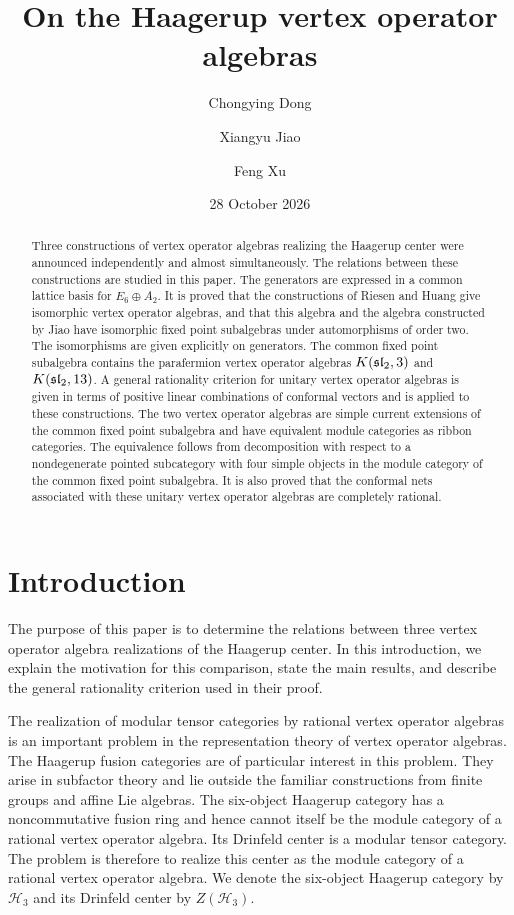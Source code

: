 \documentclass[11pt,reqno]{amsart}
\title[On the Haagerup vertex operator algebras]{On the Haagerup vertex operator algebras}
\author{Chongying Dong}
\author{Xiangyu Jiao}
\author{Feng Xu}
\date{28 October 2026}
\theoremstyle{definition}\newtheorem{definition}[theorem]{Definition}
\theoremstyle{remark}\newtheorem{remark}[theorem]{Remark}
\numberwithin{equation}{section}
\begin{document}
\begin{abstract}
Three constructions of vertex operator algebras realizing the Haagerup center were announced independently and almost simultaneously. The relations between these constructions are studied in this paper. The generators are expressed in a common lattice basis for $E_6\oplus A_2$. It is proved that the constructions of Riesen and Huang give isomorphic vertex operator algebras, and that this algebra and the algebra constructed by Jiao have isomorphic fixed point subalgebras under automorphisms of order two. The isomorphisms are given explicitly on generators. The common fixed point subalgebra contains the parafermion vertex operator algebras $K(\mathfrak{sl}_2,3)$ and $K(\mathfrak{sl}_2,13)$. A general rationality criterion for unitary vertex operator algebras is given in terms of positive linear combinations of conformal vectors and is applied to these constructions. The two vertex operator algebras are simple current extensions of the common fixed point subalgebra and have equivalent module categories as ribbon categories. {The equivalence follows from decomposition with respect to a nondegenerate pointed subcategory with four simple objects in the module category of the common fixed point subalgebra.} It is also proved that the conformal nets associated with these unitary vertex operator algebras are completely rational.
\end{abstract}
\maketitle

\section{Introduction}
The purpose of this paper is to determine the relations between three vertex operator algebra realizations of the Haagerup center. In this introduction, we explain the motivation for this comparison, state the main results, and describe the general rationality criterion used in their proof.

The realization of modular tensor categories by rational vertex operator algebras is an important problem in the representation theory of vertex operator algebras. The Haagerup fusion categories are of particular interest in this problem. They arise in subfactor theory and lie outside the familiar constructions from finite groups and affine Lie algebras. The six-object Haagerup category has a noncommutative fusion ring and hence cannot itself be the module category of a rational vertex operator algebra. Its Drinfeld center is a modular tensor category. The problem is therefore to realize this center as the module category of a rational vertex operator algebra. We denote the six-object Haagerup category by $\mathcal H_3$ and its Drinfeld center by $Z(\mathcal H_3)$.
\end{document}
